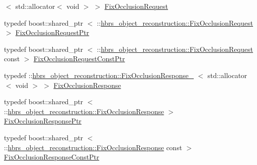 \begin{DoxyCompactItemize}
$<$ std\-::allocator$<$ void $>$ $>$ \hyperlink{namespacehbrs__object__reconstruction_a330d61c8057fd73ec5628a35f255636b}{\-Fix\-Occlusion\-Request}
\item 
typedef boost\-::shared\-\_\-ptr\*
$<$ \-::\hyperlink{namespacehbrs__object__reconstruction_a330d61c8057fd73ec5628a35f255636b}{hbrs\-\_\-object\-\_\-reconstruction\-::\-Fix\-Occlusion\-Request} $>$ \hyperlink{namespacehbrs__object__reconstruction_a27eef65a425f0684b700e2415dc6e8b7}{\-Fix\-Occlusion\-Request\-Ptr}
\item 
typedef boost\-::shared\-\_\-ptr\*
$<$ \-::\hyperlink{namespacehbrs__object__reconstruction_a330d61c8057fd73ec5628a35f255636b}{hbrs\-\_\-object\-\_\-reconstruction\-::\-Fix\-Occlusion\-Request} \*
const  $>$ \hyperlink{namespacehbrs__object__reconstruction_ad613ea2a9d09686470fcaf0c9b18ddf9}{\-Fix\-Occlusion\-Request\-Const\-Ptr}
\item 
typedef \*
\-::\hyperlink{structhbrs__object__reconstruction_1_1_fix_occlusion_response__}{hbrs\-\_\-object\-\_\-reconstruction\-::\-Fix\-Occlusion\-Response\-\_\-}\*
$<$ std\-::allocator$<$ void $>$ $>$ \hyperlink{namespacehbrs__object__reconstruction_a62a6d8a132bcd4fdf13bb7af257264ed}{\-Fix\-Occlusion\-Response}
\item 
typedef boost\-::shared\-\_\-ptr\*
$<$ \-::\hyperlink{namespacehbrs__object__reconstruction_a62a6d8a132bcd4fdf13bb7af257264ed}{hbrs\-\_\-object\-\_\-reconstruction\-::\-Fix\-Occlusion\-Response} $>$ \hyperlink{namespacehbrs__object__reconstruction_a34f9a4dc2f3b6dad5d37372697e77c6f}{\-Fix\-Occlusion\-Response\-Ptr}
\item 
typedef boost\-::shared\-\_\-ptr\*
$<$ \-::\hyperlink{namespacehbrs__object__reconstruction_a62a6d8a132bcd4fdf13bb7af257264ed}{hbrs\-\_\-object\-\_\-reconstruction\-::\-Fix\-Occlusion\-Response} \*
const  $>$ \hyperlink{namespacehbrs__object__reconstruction_a58c7a787f7d1e9e3b9a447e8b4485ff2}{\-Fix\-Occlusion\-Response\-Const\-Ptr}
\end{DoxyCompactItemize}


